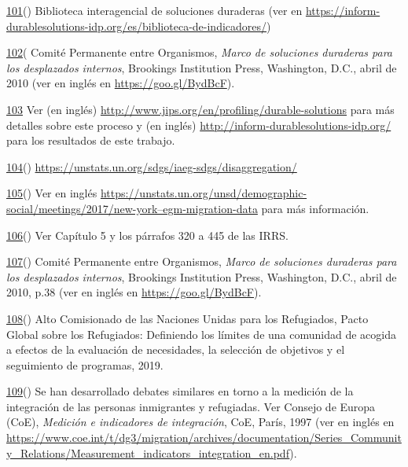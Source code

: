 \documentclass[
]{book}
\begin{document}
\protect\hyperlink{sdfootnote101anc}{101}() Biblioteca interagencial de soluciones duraderas (ver en \href{http://inform-durablesolutions-idp.org/indicators/}{https://inform-durablesolutions-idp.org/es/biblioteca-de-indicadores/})

\protect\hyperlink{sdfootnote102anc}{102}( Comité Permanente entre Organismos, \emph{Marco de soluciones duraderas para los desplazados internos}, Brookings Institution Press, Washington, D.C., abril de 2010 (ver en inglés en \url{https://goo.gl/BydBcF}).

\protect\hyperlink{sdfootnote103anc}{103} Ver (en inglés) \href{https://www.jips.org/tools-and-guidance/durable-solutions-indicators-guide/}{http://www.jips.org/en/profiling/durable-solutions} para más detalles sobre este proceso y (en inglés) \url{http://inform-durablesolutions-idp.org/} para los resultados de este trabajo.

\protect\hyperlink{sdfootnote104anc}{104}() \url{https://unstats.un.org/sdgs/iaeg-sdgs/disaggregation/}

\protect\hyperlink{sdfootnote105anc}{105}() Ver en inglés \href{https://unstats.un.org/unsd/demographic-social/meetings/2017/new-york--egm-migration-data}{https://unstats.un.org/unsd/demographic-social/meetings/2017/new-york--egm-migration-data} para más información.

\protect\hyperlink{sdfootnote106anc}{106}() Ver Capítulo 5 y los párrafos 320 a 445 de las IRRS.

\protect\hyperlink{sdfootnote107anc}{107}() Comité Permanente entre Organismos, \emph{Marco de soluciones duraderas para los desplazados internos}, Brookings Institution Press, Washington, D.C., abril de 2010, p.38 (ver en inglés en \url{https://goo.gl/BydBcF}).

\protect\hyperlink{sdfootnote108anc}{108}() Alto Comisionado de las Naciones Unidas para los Refugiados, Pacto Global sobre los Refugiados: Definiendo los límites de una comunidad de acogida a efectos de la evaluación de necesidades, la selección de objetivos y el seguimiento de programas, 2019.

\protect\hyperlink{sdfootnote109anc}{109}() Se han desarrollado debates similares en torno a la medición de la integración de las personas inmigrantes y refugiadas. Ver Consejo de Europa (CoE), \emph{Medición e indicadores de integración}, CoE, París, 1997 (ver en inglés en \url{https://www.coe.int/t/dg3/migration/archives/documentation/Series_Community_Relations/Measurement_indicators_integration_en.pdf}).
\end{document}

